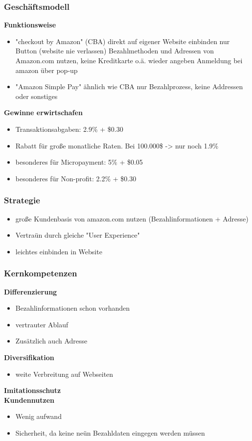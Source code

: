 \subsubsection{ Geschäftsmodell}
\textbf{Funktionsweise}\\
	\begin{itemize}
	\item "checkout by Amazon" (CBA)
	\subitem  direkt auf eigener Website einbinden nur Button (website nie verlassen)
	\subitem  Bezahlmethoden und Adressen von Amazon.com nutzen, keine Kreditkarte o.ä. wieder angeben
	\subitem  Anmeldung bei amazon über pop-up
	\item "Amazon Simple Pay"
	\subitem  ähnlich wie CBA
	\subitem  nur Bezahlprozess, keine Addressen oder sonstiges
	\end{itemize}
	
\textbf{Gewinne erwirtschafen}\\
	\begin{itemize}
	\item Transaktionsabgaben: 2.9\% + \$0.30
	\item Rabatt für große monatliche Raten. Bei 100.000\$ -> nur noch 1.9\%
	\item besonderes für Micropayment: 5\% + \$0.05
	\item besonderes für Non-profit: 2.2\% + \$0.30
	\end{itemize}


\subsubsection{ Strategie}
	\begin{itemize}
	\item große Kundenbasis von amazon.com nutzen (Bezahlinformationen + Adresse)
	\item Vertraün durch gleiche "User Experience"
	\item leichtes einbinden in Website
	\end{itemize}

\subsubsection{ Kernkompetenzen}
\textbf{Differenzierung}\\
	\begin{itemize}
	\item Bezahlinformationen schon vorhanden
	\item vertrauter Ablauf
	\item Zusätzlich auch Adresse
	\end{itemize}
\textbf{Diversifikation}\\
	\begin{itemize}
	\item weite Verbreitung auf Webseiten
	\end{itemize}
\textbf{Imitationsschutz}\\
\textbf{Kundennutzen}\\
	\begin{itemize}
	\item Wenig aufwand
	\item Sicherheit, da keine neün Bezahldaten eingegen werden müssen
	\end{itemize}

